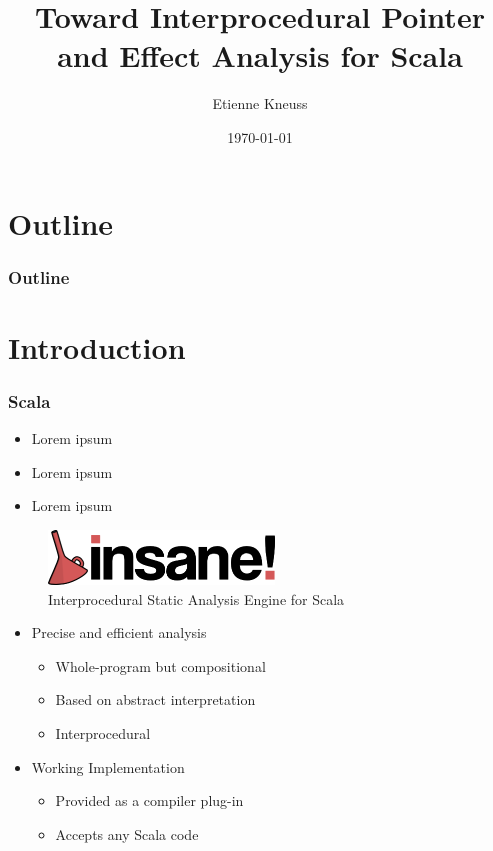 \documentclass[hyperref={pdfpagelabels=false}]{beamer}
\begin{document}
\title{Toward Interprocedural Pointer and Effect Analysis for Scala}
\author{Etienne Kneuss}
\date{\today}


\begin{frame}
    \titlepage
\end{frame}

\section*{Outline}
\begin{frame}
    \frametitle{Outline}
    \tableofcontents
\end{frame}

\section{Introduction}
\begin{frame}
    \frametitle{Scala}
    \begin{itemize}
        \item Lorem ipsum
        \item Lorem ipsum
        \item Lorem ipsum
    \end{itemize}
\end{frame}


\begin{frame}
    \begin{figure}[t]
        \includegraphics[width=60mm]{../../logo.png}\\
        Interprocedural Static Analysis Engine for Scala
    \end{figure}

    \begin{itemize}
        \item Precise and efficient analysis
            \begin{itemize}
                \item Whole-program but compositional
                \item Based on abstract interpretation
                \item Interprocedural
            \end{itemize}
        \item Working Implementation
            \begin{itemize}
                \item Provided as a compiler plug-in
                \item Accepts any Scala code
            \end{itemize}
    \end{itemize}
\end{frame}
\end{document}
